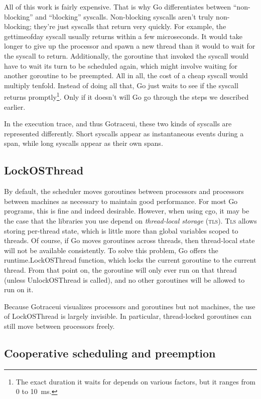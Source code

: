 \documentclass[10pt,letterpaper,oneside,openany,english]{memoir}
\newcommand{\code}[1]{{\ttfamily\mbox{#1}}}
\begin{document}
All of this work is fairly expensive.
That is why Go differentiates between ``non-blocking'' and ``blocking'' syscalls.
Non-blocking syscalls aren't truly non-blocking; they're just syscalls that return very quickly.
For example, the \code{gettimeofday} syscall usually returns within a few microseconds.
It would take longer to give up the processor and spawn a new thread than it would to wait for the syscall to return.
Additionally, the goroutine that invoked the syscall would have to wait its turn to be scheduled again, which might involve waiting for another goroutine to be preempted.
All in all, the cost of a cheap syscall would multiply tenfold.
Instead of doing all that, Go just waits to see if the syscall returns promptly\footnote{The exact duration it waits for depends on various factors, but it ranges from \num{0} to \qty{10}{\milli\second}.}.
Only if it doesn't will Go go through the steps we described earlier.

In the execution trace, and thus Gotraceui, these two kinds of syscalls are represented differently.
Short syscalls appear as instantaneous events during a span, while long syscalls appear as their own spans.

\subsection{\code{LockOSThread}}

By default, the scheduler moves goroutines between processors and processors between machines as necessary to maintain good performance.
For most Go programs, this is fine and indeed desirable.
However, when using cgo, it may be the case that the libraries you use depend on \emph{thread-local storage} (\textsc{tls}).
\textsc{Tls} allows storing per-thread state, which is little more than global variables scoped to threads.
Of course, if Go moves goroutines across threads, then thread-local state will not be available consistently.
To solve this problem, Go offers the \code{runtime.LockOSThread} function, which locks the current goroutine to the current thread.
From that point on, the goroutine will only ever run on that thread (unless \code{UnlockOSThread} is called), and no other goroutines will be allowed to run on it.

Because Gotraceui visualizes processors and goroutines but not machines, the use of \code{LockOSThread} is largely invisible.
In particular, thread-locked goroutines can still move between processors freely.

\subsection{Cooperative scheduling and preemption}
\end{document}
